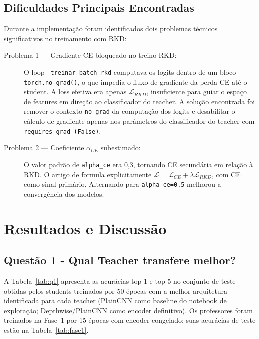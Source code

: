 \documentclass[
  article,            %
  11pt,               %
  letterpaper,        %
  oneside,            %
  sumario = tradicional
]{abntex2}
\begin{document}
\subsection{Dificuldades Principais Encontradas}

Durante a implementação foram identificados dois problemas técnicos
significativos no treinamento com RKD:

\begin{description}
  \item[Problema 1 — Gradiente CE bloqueado no treino RKD:]
    O loop \texttt{\_treinar\_batch\_rkd} computava os logits dentro de um bloco
    \texttt{torch.no\_grad()}, o que impedia o fluxo de gradiente da perda CE
    até o student. A loss efetiva era apenas $\mathcal{L}_{RKD}$, insuficiente
    para guiar o espaço de features em direção ao classificador do teacher.
    A solução encontrada foi remover o contexto \texttt{no\_grad} da computação dos logits e desabilitar o cálculo de gradiente apenas nos parâmetros do
    classificador do teacher com \texttt{requires\_grad\_(False)}.

  \item[Problema 2 — Coeficiente $\alpha_{CE}$ subestimado:]
    O valor padrão de \texttt{alpha\_ce} era 0,3, tornando CE secundária em
    relação à RKD. O artigo de \textcite{park2019rkd} formula explicitamente
    $\mathcal{L} = \mathcal{L}_{CE} + \lambda \mathcal{L}_{RKD}$, com CE como
    sinal primário. Alternando para \texttt{alpha\_ce=0.5} melhorou a convergência dos modelos.

\end{description}


\section{Resultados e Discussão}

\subsection{Questão 1 - Qual Teacher transfere melhor?}
\label{sec:q1}

A Tabela~\ref{tab:q1} apresenta as acurácias top-1 e top-5 no conjunto de teste
obtidas pelos students treinados por 50 épocas com a melhor arquitetura identificada para cada teacher (PlainCNN como baseline do notebook de exploração; Depthwise/PlainCNN como encoder
definitivo). Os professores foram treinados na Fase~1 por 15 épocas com encoder
congelado; suas acurácias de teste estão na Tabela~\ref{tab:fase1}.\\
\end{document}

